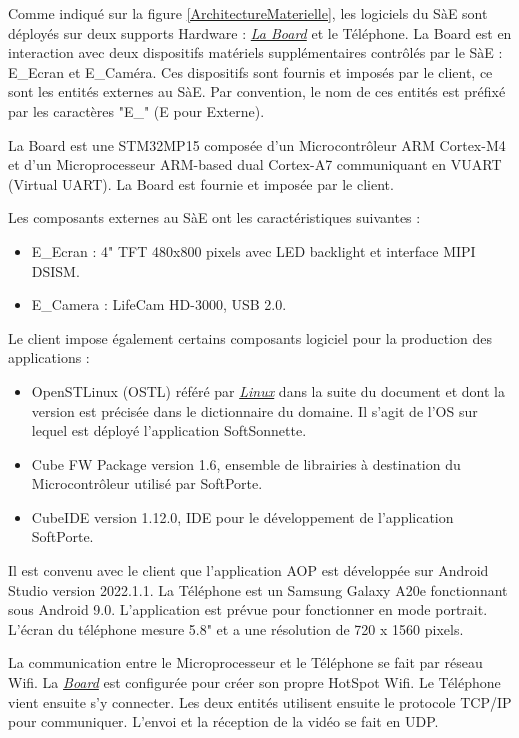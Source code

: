 \newpage
Comme indiqué sur la figure \ref{ArchitectureMaterielle}, les logiciels du SàE sont déployés sur deux supports Hardware : \hyperlink{bd}{\textit{La Board}} et le Téléphone.
La Board est en interaction avec deux dispositifs matériels supplémentaires contrôlés par le SàE : E\_Ecran et E\_Caméra.  
Ces dispositifs sont fournis et imposés par le client, ce sont les entités externes au SàE.
Par convention, le nom de ces entités est préfixé par les caractères "E\_" (E pour Externe).

La Board est une STM32MP15 composée d'un Microcontrôleur ARM Cortex-M4 et d'un Microprocesseur ARM-based dual Cortex-A7 communiquant en VUART (Virtual UART).
La Board est fournie et imposée par le client.

Les composants externes au SàE ont les caractéristiques suivantes :
\begin{itemize}
    \item E\_Ecran : 4" TFT 480x800 pixels avec LED backlight et interface MIPI DSISM.
    \item E\_Camera : LifeCam HD-3000, USB 2.0. \\
\end{itemize}

Le client impose également certains composants logiciel pour la production des applications :
\begin{itemize}
    \item OpenSTLinux (OSTL) référé par \hyperlink{linux}{\textit{Linux}} dans la suite du document et dont la version est précisée dans le dictionnaire du domaine. Il s'agit de l'OS sur lequel est déployé l'application SoftSonnette.
    \item Cube FW Package version 1.6, ensemble de librairies à destination du Microcontrôleur utilisé par SoftPorte.
    \item CubeIDE version 1.12.0, IDE pour le développement de l'application SoftPorte. \\
\end{itemize}

Il est convenu avec le client que l'application AOP est développée sur Android Studio version 2022.1.1.
La Téléphone est un Samsung Galaxy A20e fonctionnant sous Android 9.0. 
L'application est prévue pour fonctionner en mode portrait.
L'écran du téléphone mesure 5.8" et a une résolution de 720 x 1560 pixels.

La communication entre le Microprocesseur et le Téléphone se fait par réseau Wifi.
La \hyperlink{bd}{\textit{Board}} est configurée pour créer son propre HotSpot Wifi. 
Le Téléphone vient ensuite s'y connecter. 
Les deux entités utilisent ensuite le protocole TCP/IP pour communiquer. 
L'envoi et la réception de la vidéo se fait en UDP.

